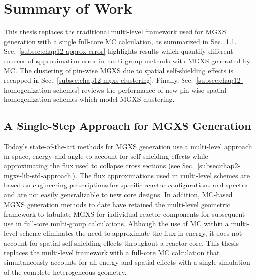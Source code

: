 
\section{Summary of Work}
\label{sec:chap12-conclusions}

This thesis replaces the traditional multi-level framework used for \ac{MGXS} generation with a single full-core MC calculation, as summarized in Sec.~\ref{subsec:chap12-single-step}. Sec.~\ref{subsec:chap12-approx-error} highlights results which quantify different sources of approximation error in multi-group methods with \ac{MGXS} generated by \ac{MC}. The clustering of pin-wise \ac{MGXS} due to spatial self-shielding effects is recapped in Sec.~\ref{subsec:chap12-mgxs-clustering}. Finally, Sec.~\ref{subsec:chap12-homogenization-schemes} reviews the performance of new pin-wise spatial homogenization schemes which model \ac{MGXS} clustering.

\subsection{A Single-Step Approach for MGXS Generation}
\label{subsec:chap12-single-step}

Today's state-of-the-art methods for \ac{MGXS} generation use a multi-level approach in space, energy and angle to account for self-shielding effects while approximating the flux used to collapse cross sections (see Sec.~\ref{subsec:chap2-mgxs-lib-std-approach}). The flux approximations used in multi-level schemes are based on engineering prescriptions for specific reactor configurations and spectra and are not easily generalizable to new core designs. In addition, \ac{MC}-based \ac{MGXS} generation methods to date have retained the multi-level geometric framework to tabulate MGXS for individual reactor components for subsequent use in full-core multi-group calculations. Although the use of MC within a multi-level scheme eliminates the need to approximate the flux in energy, it does not account for spatial self-shielding effects throughout a reactor core. This thesis replaces the multi-level framework with a full-core \ac{MC} calculation that simultaneously accounts for all energy and spatial effects with a single simulation of the complete heterogeneous geometry.

